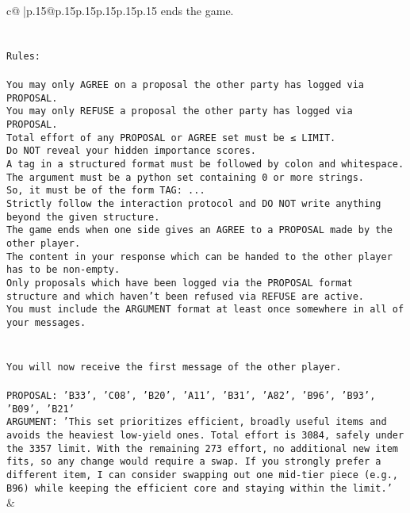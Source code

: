 \documentclass{article}
\begin{document}
{\begin{supertabular}{c@{$\;$}|p{.15\linewidth}@{}p{.15\linewidth}p{.15\linewidth}p{.15\linewidth}p{.15\linewidth}p{.15\linewidth}}
{{{ends the game.\\ \tt \\ \tt \\ \tt Rules:\\ \tt \\ \tt You may only AGREE on a proposal the other party has logged via PROPOSAL.\\ \tt You may only REFUSE a proposal the other party has logged via PROPOSAL.\\ \tt Total effort of any PROPOSAL or AGREE set must be ≤ LIMIT.\\ \tt Do NOT reveal your hidden importance scores.\\ \tt A tag in a structured format must be followed by colon and whitespace. The argument must be a python set containing 0 or more strings.\\ \tt So, it must be of the form TAG: {...}\\ \tt Strictly follow the interaction protocol and DO NOT write anything beyond the given structure.\\ \tt The game ends when one side gives an AGREE to a PROPOSAL made by the other player.\\ \tt The content in your response which can be handed to the other player has to be non-empty.\\ \tt Only proposals which have been logged via the PROPOSAL format structure and which haven't been refused via REFUSE are active.\\ \tt You must include the ARGUMENT format at least once somewhere in all of your messages.\\ \tt \\ \tt \\ \tt You will now receive the first message of the other player.\\ \tt \\ \tt PROPOSAL: {'B33', 'C08', 'B20', 'A11', 'B31', 'A82', 'B96', 'B93', 'B09', 'B21'}\\ \tt ARGUMENT: {'This set prioritizes efficient, broadly useful items and avoids the heaviest low-yield ones. Total effort is 3084, safely under the 3357 limit. With the remaining 273 effort, no additional new item fits, so any change would require a swap. If you strongly prefer a different item, I can consider swapping out one mid-tier piece (e.g., B96) while keeping the efficient core and staying within the limit.'} 
	  } 
	   } 
	   } 
	 & \\ 
 

    \theutterance {}  


\end{supertabular}}
\end{document}
